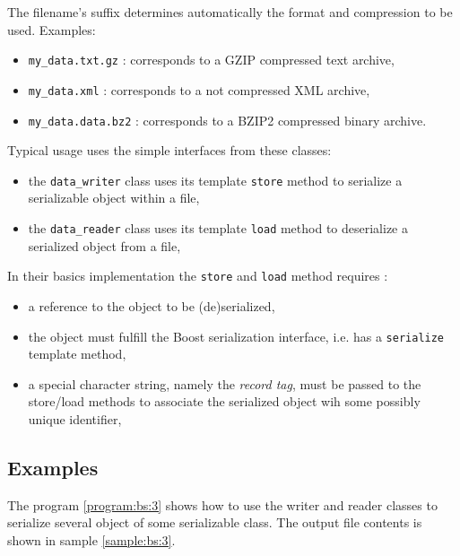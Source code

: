 \documentclass[a4paper,12pt]{article}
\newcommand{\pn}{\par\noindent}
\begin{document}
\pn  The filename's  suffix  determines automatically  the format  and
compression to be used. Examples:

\begin{itemize}
\item \texttt{my\_data.txt.gz} : corresponds to a GZIP compressed text
  archive,
\item  \texttt{my\_data.xml} :  corresponds  to a  not compressed  XML
  archive,
\item \texttt{my\_data.data.bz2}  : corresponds to  a BZIP2 compressed
  binary archive.
\end{itemize}


\pn Typical usage uses the simple interfaces from these classes:

\begin{itemize}    

\item the \texttt{data\_writer} class uses its template \texttt{store} 
  method to serialize a serializable object within a file,

\item the \texttt{data\_reader} class uses its template \texttt{load} 
  method to deserialize a serialized object from a file,
  
\end{itemize}

\pn In their basics implementation the \texttt{store} and \texttt{load} 
method requires :

\begin{itemize}

\item a reference to the object to be (de)serialized,

\item the object must fulfill the Boost serialization interface, i.e.
has a \texttt{serialize} template method,

\item a special character string, namely the \emph{record tag}, must be passed
to the store/load methods to associate the serialized object wih some possibly
unique identifier,

\end{itemize}

\subsection{Examples}

\pn The program \ref{program:bs:3} shows how to use the writer and reader classes
to serialize several object of some serializable class. The output file contents is shown in sample
\ref{sample:bs:3}.
\end{document}
